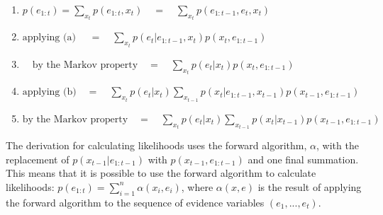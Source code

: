 \begin{center}
\end{center}


\begin{enumerate}

\item[] {\hfil $p(e_{1:t}) = \sum_{x_t}p(e_{1:t}, x_t) \quad = \quad \sum_{x_t}p({e_{1:t-1}, e_t, x_t}) $
}
\item[] {\hfil $\text{applying (a) } \quad= \quad
\sum_{x_t}{p(e_t | e_{1:t-1}, x_t)p(x_t, e_{1:t-1})}$
}
\item[] {\hfil $\quad \text{by the Markov property} 
\quad = \quad \sum_{x_t}p(e_t | x_t)p(x_t, e_{1:t-1})$
}

\item[] {\hfil $\text{applying (b)} \quad =  \quad
\sum_{x_t}p(e_t | x_t) \sum_{x_{t-1}}p(x_t|e_{1:t-1}, x_{t-1}) p(x_{t-1},e_{1:t-1})$
}

\item[] {\hfil $\text{by the Markov property} \quad = \quad 
\sum_{x_t}{p(e_t | x_t)\sum_{x_{t-1}}p(x_t|x_{t-1}) p(x_{t-1},e_{1:t-1})}$
}

\end{enumerate}

The derivation for calculating likelihoods uses the forward algorithm, $\alpha$, with the replacement of  $p(x_{t-1}|e_{1:t-1})$ with $p(x_{t-1}, e_{1:t-1})$ and one final summation. This means that it is possible to use the forward algorithm to calculate likelihoods: $p(e_{1:t}) = \sum_{i=1}^{n} \alpha(x_i, e_i)$, where $\alpha(x, e)$ is the result of applying the forward algorithm to the sequence of evidence variables $(e_1, ..., e_t)$.




